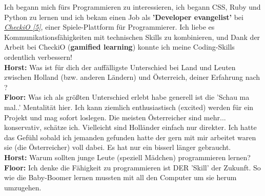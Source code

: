 Ich begann mich fürs Programmieren zu interessieren, ich begann CSS, Ruby und Python zu lernen und ich bekam einen Job als \textbf{'Developer evangelist'} bei \href{http://www.checkio.org/}{\textit{CheckiO [5]}}, einer Spiele-Plattform für Programmierer. Ich liebe es Kommunikationsfähigkeiten mit technischen Skills zu kombinieren, und Dank der Arbeit bei CheckiO (\textbf{gamified learning}) konnte ich meine Coding-Skills ordentlich verbessern! \\
\textbf{Horst:} Was ist für dich der auffälligste Unterschied bei Land und Leuten zwischen Holland (bzw. anderen Ländern) und Österreich, deiner Erfahrung nach ? \\
\textbf{Floor:} Was ich als größten Unterschied erlebt habe generell ist die 'Schau ma mal..' Mentalität hier. Ich kann ziemlich enthusiastisch (excited) werden für ein Projekt und mag sofort loslegen. Die meisten Österreicher sind mehr... konservativ, schätze ich. Vielleicht sind Holländer einfach nur direkter. Ich hatte das Gefühl sobald ich jemanden gefunden hatte der gern mit mir arbeitet waren sie (die Österreicher) voll dabei. Es hat nur ein bisserl länger gebraucht. \\
\textbf{Horst:} Warum sollten junge Leute (speziell Mädchen) programmieren lernen? \\
\textbf{Floor:} Ich denke die Fähigkeit zu programmieren ist DER 'Skill' der Zukunft. So wie die Baby-Boomer lernen mussten mit all den Computer um sie herum umzugehen. 

